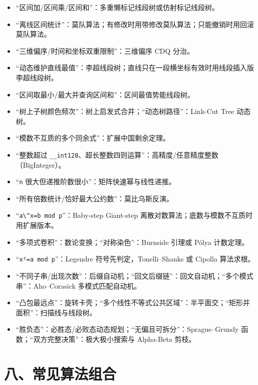 \begin{itemize}
\tightlist
\item
  ``区间加/区间乘/区间和''：多重懒标记线段树或仿射标记线段树。
\item
  ``离线区间统计''：莫队算法；有修改时用带修改莫队算法；只能撤销时用回滚莫队算法。
\item
  ``三维偏序/时间和坐标双重限制''：三维偏序 CDQ 分治。
\item
  ``动态维护直线最值''：李超线段树；直线只在一段横坐标有效时用线段插入版李超线段树。
\item
  ``区间取最小/最大并查询区间和''：区间最值势能线段树。
\item
  ``树上子树颜色频次''：树上启发式合并；``动态树路径''：Link-Cut Tree 动态树。
\item
  ``模数不互质的多个同余式''：扩展中国剩余定理。
\item
  ``整数超过 \passthrough{\lstinline!__int128!}、超长整数四则运算''：高精度/任意精度整数（BigInteger）。
\item
  ``\passthrough{\lstinline!n!} 很大但递推阶数很小''：矩阵快速幂与线性递推。
\item
  ``所有倍数统计/恰好最大公约数''：莫比乌斯反演。
\item
  ``\passthrough{\lstinline!a\^x=b mod p!}''：Baby-step Giant-step 离散对数算法；底数与模数不互质时用扩展版本。
\item
  ``多项式卷积''：数论变换；``对称染色''：Burnside 引理或 Pólya 计数定理。
\item
  ``\passthrough{\lstinline!x²=a mod p!}''：Legendre 符号先判定，Tonelli--Shanks 或 Cipolla 算法求根。
\item
  ``不同子串/出现次数''：后缀自动机；``回文后缀链''：回文自动机；``多个模式串''：Aho--Corasick 多模式匹配自动机。
\item
  ``凸包最远点''：旋转卡壳；``多个线性不等式公共区域''：半平面交；``矩形并面积''：扫描线与线段树。
\item
  ``胜负态''：必胜态/必败态动态规划；``无偏且可拆分''：Sprague--Grundy 函数；``双方完整决策''：极大极小搜索与 Alpha-Beta 剪枝。
\end{itemize}

\section{八、常见算法组合}\label{ux516bux5e38ux89c1ux7b97ux6cd5ux7ec4ux5408}

